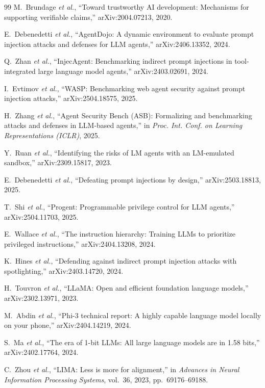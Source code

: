 \documentclass[journal,onecolumn,12pt]{IEEEtran}
\begin{document}
\begin{thebibliography}{99}
 M.~Brundage \emph{et al.}, ``Toward trustworthy AI development: Mechanisms for supporting verifiable claims,'' arXiv:2004.07213, 2020.

 E.~Debenedetti \emph{et al.}, ``AgentDojo: A dynamic environment to evaluate prompt injection attacks and defenses for LLM agents,'' arXiv:2406.13352, 2024.

 Q.~Zhan \emph{et al.}, ``InjecAgent: Benchmarking indirect prompt injections in tool-integrated large language model agents,'' arXiv:2403.02691, 2024.

 I.~Evtimov \emph{et al.}, ``WASP: Benchmarking web agent security against prompt injection attacks,'' arXiv:2504.18575, 2025.

 H.~Zhang \emph{et al.}, ``Agent Security Bench (ASB): Formalizing and benchmarking attacks and defenses in LLM-based agents,'' in \emph{Proc. Int. Conf. on Learning Representations (ICLR)}, 2025.

 Y.~Ruan \emph{et al.}, ``Identifying the risks of LM agents with an LM-emulated sandbox,'' arXiv:2309.15817, 2023.

 E.~Debenedetti \emph{et al.}, ``Defeating prompt injections by design,'' arXiv:2503.18813, 2025.

 T.~Shi \emph{et al.}, ``Progent: Programmable privilege control for LLM agents,'' arXiv:2504.11703, 2025.

 E.~Wallace \emph{et al.}, ``The instruction hierarchy: Training LLMs to prioritize privileged instructions,'' arXiv:2404.13208, 2024.

 K.~Hines \emph{et al.}, ``Defending against indirect prompt injection attacks with spotlighting,'' arXiv:2403.14720, 2024.

 H.~Touvron \emph{et al.}, ``LLaMA: Open and efficient foundation language models,'' arXiv:2302.13971, 2023.

 M.~Abdin \emph{et al.}, ``Phi-3 technical report: A highly capable language model locally on your phone,'' arXiv:2404.14219, 2024.

 S.~Ma \emph{et al.}, ``The era of 1-bit LLMs: All large language models are in 1.58 bits,'' arXiv:2402.17764, 2024.

 C.~Zhou \emph{et al.}, ``LIMA: Less is more for alignment,'' in \emph{Advances in Neural Information Processing Systems}, vol.~36, 2023, pp.~69176--69188.


\end{thebibliography}
\end{document}
